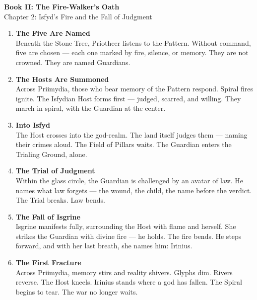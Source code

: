 \documentclass[9pt]{article}
\begin{document}
\begin{center}
    \Large\textbf{Book II: The Fire-Walker's Oath} \\
    \large Chapter 2: Isfyd's Fire and the Fall of Judgment \\
\end{center}

\vspace{1in}


\begin{center}
\begin{enumerate}
    \item \textbf{The Five Are Named} \\
    Beneath the Stone Tree, Priotheer listens to the Pattern. Without command, five are chosen — each one marked by fire, silence, or memory. They are not crowned. They are named Guardians.

    \vspace{.3in}
    \item \textbf{The Hosts Are Summoned} \\
    Across Priimydia, those who bear memory of the Pattern respond. Spiral fires ignite. The Isfydian Host forms first — judged, scarred, and willing. They march in spiral, with the Guardian at the center.

    \vspace{.3in}
    \item \textbf{Into Isfyd} \\
    The Host crosses into the god-realm. The land itself judges them — naming their crimes aloud. The Field of Pillars waits. The Guardian enters the Trialing Ground, alone.

    \vspace{.3in}
    \item \textbf{The Trial of Judgment} \\
    Within the glass circle, the Guardian is challenged by an avatar of law. He names what law forgets — the wound, the child, the name before the verdict. The Trial breaks. Law bends.

    \vspace{.3in}
    \item \textbf{The Fall of Isgrine} \\
    Isgrine manifests fully, surrounding the Host with flame and herself. She strikes the Guardian with divine fire — he holds. The fire bends. He steps forward, and with her last breath, she names him: Irinius.

    \vspace{.3in}
    \item \textbf{The First Fracture} \\
    Across Priimydia, memory stirs and reality shivers. Glyphs dim. Rivers reverse. The Host kneels. Irinius stands where a god has fallen. The Spiral begins to tear. The war no longer waits.
\end{enumerate}
\end{center}
\end{document}
